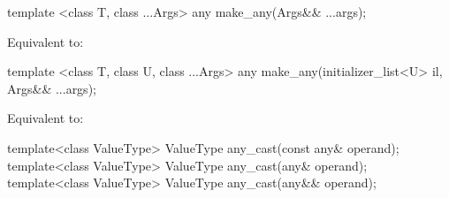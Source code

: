 %
\begin{itemdecl}
template <class T, class ...Args>
  any make_any(Args&& ...args);
\end{itemdecl}

\begin{itemdescr}
\pnum
\effects
Equivalent to: 
\end{itemdescr}

%
\begin{itemdecl}
template <class T, class U, class ...Args>
  any make_any(initializer_list<U> il, Args&& ...args);
\end{itemdecl}

\begin{itemdescr}
\pnum
\effects
Equivalent to: 
\end{itemdescr}

%
\begin{itemdecl}
template<class ValueType>
  ValueType any_cast(const any& operand);
template<class ValueType>
  ValueType any_cast(any& operand);
template<class ValueType>
  ValueType any_cast(any&& operand);
\end{itemdecl}

